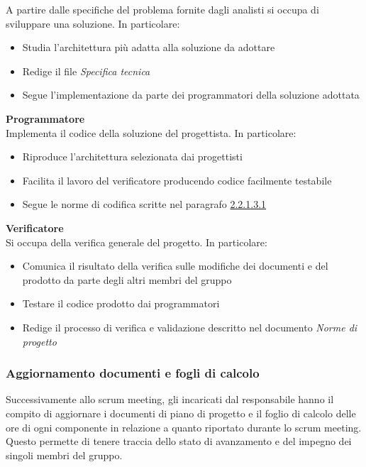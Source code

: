 \documentclass[12pt]{article}
\begin{document}
A partire dalle specifiche del problema fornite dagli analisti si occupa di sviluppare una soluzione. In particolare:
\begin{itemize}
    \item Studia l'architettura più adatta alla soluzione da adottare
    \item Redige il file \textit{Specifica tecnica}
    \item Segue l'implementazione da parte dei programmatori della soluzione adottata
\end{itemize}
\textbf{Programmatore}\\
Implementa il codice della soluzione del progettista. In particolare:
\begin{itemize}
    \item Riproduce l'architettura selezionata dai progettisti
    \item Facilita il lavoro del verificatore producendo codice facilmente testabile
    \item Segue le norme di codifica scritte nel paragrafo \hyperref[StileCodifica]{2.2.1.3.1}
\end{itemize}
\textbf{Verificatore}\\
Si occupa della verifica generale del progetto. In particolare:
\begin{itemize}
    \item Comunica il risultato della verifica sulle modifiche dei documenti e del prodotto da parte degli altri membri del gruppo
    \item Testare il codice prodotto dai programmatori
    \item Redige il processo di verifica e validazione descritto nel documento \textit{Norme di progetto}
\end{itemize}

\subsubsection{Aggiornamento documenti e fogli di calcolo}
Successivamente allo scrum meeting, gli incaricati dal responsabile hanno il compito di aggiornare i documenti di piano di progetto e il foglio di calcolo delle ore di ogni componente in relazione a quanto riportato durante lo scrum meeting. 
Questo permette di tenere traccia dello stato di avanzamento e del impegno dei singoli membri del gruppo.
\end{document}
